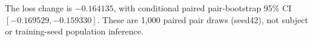The loss change is $-0.164135$, with conditional paired pair-bootstrap 95\% CI $[-0.169529,-0.159330]$. These are 1,000 paired pair draws (seed42), not subject or training-seed population inference.
